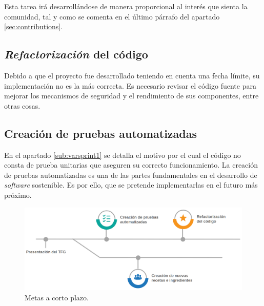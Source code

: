 Esta tarea irá desarrollándose de manera proporcional al interés que sienta la comunidad, tal y como se comenta en el último párrafo del apartado \ref{sec:contributions}.\sn

\subsection{\textit{Refactorización} del código}

Debido a que el proyecto fue desarrollado teniendo en cuenta una fecha límite, su implementación no es la más correcta. Es necesario revisar el código fuente para mejorar los mecanismos de seguridad y el rendimiento de sus componentes, entre otras cosas.\sn

\subsection{Creación de pruebas automatizadas}

En el apartado \ref{sub:varsprint1} se detalla el motivo por el cual el código no consta de prueba unitarias que aseguren su correcto funcionamiento. La creación de pruebas automatizadas es una de las partes fundamentales en el desarrollo de \textit{software} sostenible. Es por ello, que se pretende implementarlas en el futuro más próximo.\n

\begin{figure}[H]
    \centering
    \includegraphics[width=13cm]{img/tables/37_Goals.png}
    \caption{Metas a corto plazo.}
    \label{fig:goals}
\end{figure}
